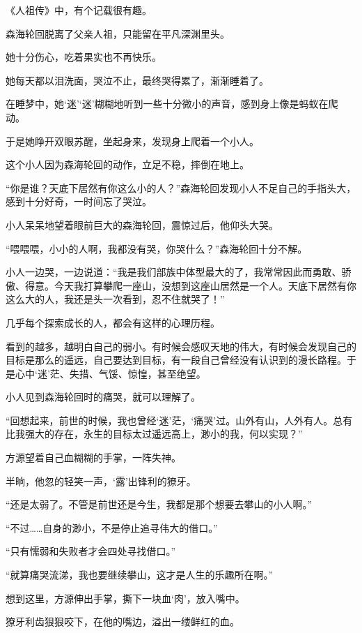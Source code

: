 \begin{this_body}
《人祖传》中，有个记载很有趣。

森海轮回脱离了父亲人祖，只能留在平凡深渊里头。

她十分伤心，吃着果实也不再快乐。

她每天都以泪洗面，哭泣不止，最终哭得累了，渐渐睡着了。

在睡梦中，她‘迷’‘迷’糊糊地听到一些十分微小的声音，感到身上像是蚂蚁在爬动。

于是她睁开双眼苏醒，坐起身来，发现身上爬着一个小人。

这个小人因为森海轮回的动作，立足不稳，摔倒在地上。

“你是谁？天底下居然有你这么小的人？”森海轮回发现小人不足自己的手指头大，感到十分好奇，一时间忘了哭泣。

小人呆呆地望着眼前巨大的森海轮回，震惊过后，他仰头大哭。

“喂喂喂，小小的人啊，我都没有哭，你哭什么？”森海轮回十分不解。

小人一边哭，一边说道：“我是我们部族中体型最大的了，我常常因此而勇敢、骄傲、得意。今天我打算攀爬一座山，没想到这座山居然是一个人。天底下居然有你这么大的人，我还是头一次看到，忍不住就哭了！”

几乎每个探索成长的人，都会有这样的心理历程。

看到的越多，越明白自己的弱小。有时候会感叹天地的伟大，有时候会发现自己的目标是那么的遥远，自己要达到目标，有一段自己曾经没有认识到的漫长路程。于是心中‘迷’茫、失措、气馁、惊惶，甚至绝望。

小人见到森海轮回时的痛哭，就可以理解了。

“回想起来，前世的时候，我也曾经‘迷’茫，‘痛哭’过。山外有山，人外有人。总有比我强大的存在，永生的目标太过遥远高上，渺小的我，何以实现？”

方源望着自己血糊糊的手掌，一阵失神。

半晌，他忽的轻笑一声，‘露’出锋利的獠牙。

“还是太弱了。不管是前世还是今生，我都是那个想要去攀山的小人啊。”

“不过……自身的渺小，不是停止追寻伟大的借口。”

“只有懦弱和失败者才会四处寻找借口。”

“就算痛哭流涕，我也要继续攀山，这才是人生的乐趣所在啊。”

想到这里，方源伸出手掌，撕下一块血‘肉’，放入嘴中。

獠牙利齿狠狠咬下，在他的嘴边，溢出一缕鲜红的血。

\end{this_body}

